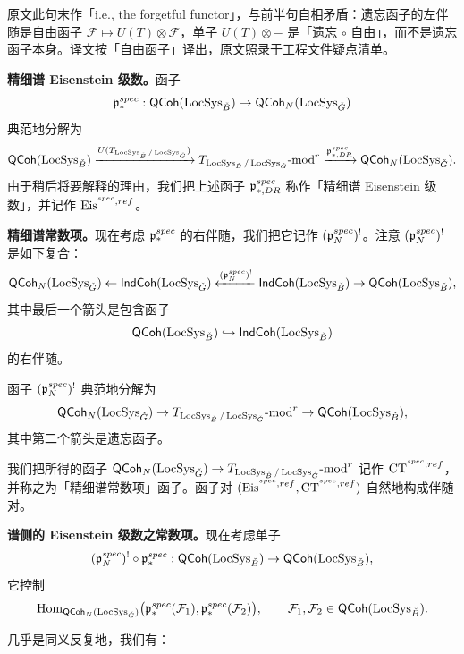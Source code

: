 \begin{annote}
原文此句末作「i.e., the forgetful functor」，与前半句自相矛盾：遗忘函子的左伴随是自由函子 $\mathcal F\mapsto U(T)\otimes\mathcal F$，单子 $U(T)\otimes-$ 是「遗忘 $\circ$ 自由」，而不是遗忘函子本身。译文按「自由函子」译出，原文照录于工程文件疑点清单。\par\vspace{0.15em}{\raggedleft 【来源：原书 p.6 §4.2（A）；译者按（单子与伴随函子的一般理论）】\par}
\end{annote}

\textbf{精细谱 Eisenstein 级数。}函子
\[
  \mathfrak{p}^{spec}_* : \mathsf{QCoh}(\operatorname{LocSys}_{\check B})\to\mathsf{QCoh}_N(\operatorname{LocSys}_{\check G})
\]
典范地分解为
\[
  \mathsf{QCoh}(\operatorname{LocSys}_{\check B})\xrightarrow{U(T_{\operatorname{LocSys}_{\check B}/\operatorname{LocSys}_{\check G}})}
  T_{\operatorname{LocSys}_{\check B}/\operatorname{LocSys}_{\check G}}\text{-}\mathrm{mod}^r
  \xrightarrow{\mathfrak{p}^{spec}_{*,DR}}
  \mathsf{QCoh}_N(\operatorname{LocSys}_{\check G}).
\]
由于稍后将要解释的理由，我们把上述函子 $\mathfrak{p}^{spec}_{*,DR}$ 称作「精细谱 Eisenstein 级数」，并记作 $\mathrm{Eis}^{^{spec},ref}$。

\textbf{精细谱常数项。}现在考虑 $\mathfrak{p}^{spec}_*$ 的右伴随，我们把它记作 $(\mathfrak{p}^{spec}_N)^!$。注意 $(\mathfrak{p}^{spec}_N)^!$ 是如下复合：
\[
  \mathsf{QCoh}_N(\operatorname{LocSys}_{\check G})\leftarrow \mathsf{IndCoh}(\operatorname{LocSys}_{\check G})
  \xleftarrow{(\mathfrak{p}^{spec}_N)^!}\mathsf{IndCoh}(\operatorname{LocSys}_{\check B})
  \to \mathsf{QCoh}(\operatorname{LocSys}_{\check B}),
\]
其中最后一个箭头是包含函子
\[
  \mathsf{QCoh}(\operatorname{LocSys}_{\check B})\hookrightarrow\mathsf{IndCoh}(\operatorname{LocSys}_{\check B})
\]
的右伴随。

函子 $(\mathfrak{p}^{spec}_N)^!$ 典范地分解为
\[
  \mathsf{QCoh}_N(\operatorname{LocSys}_{\check G})\to
  T_{\operatorname{LocSys}_{\check B}/\operatorname{LocSys}_{\check G}}\text{-}\mathrm{mod}^r\to
  \mathsf{QCoh}(\operatorname{LocSys}_{\check B}),
\]
其中第二个箭头是遗忘函子。

我们把所得的函子 $\mathsf{QCoh}_N(\operatorname{LocSys}_{\check G})\to T_{\operatorname{LocSys}_{\check B}/\operatorname{LocSys}_{\check G}}\text{-}\mathrm{mod}^r$ 记作 $\mathrm{CT}^{^{spec},ref}$，并称之为「精细谱常数项」函子。函子对 $(\mathrm{Eis}^{^{spec},ref},\mathrm{CT}^{^{spec},ref})$ 自然地构成伴随对。

\textbf{谱侧的 Eisenstein 级数之常数项。}现在考虑单子
\[
  (\mathfrak{p}^{spec}_N)^!\circ\mathfrak{p}^{spec}_* : \mathsf{QCoh}(\operatorname{LocSys}_{\check B})\to\mathsf{QCoh}(\operatorname{LocSys}_{\check B}),
\]
它控制
\[
  \operatorname{Hom}_{\mathsf{QCoh}_N(\operatorname{LocSys}_{\check G})}\bigl(\mathfrak{p}^{spec}_*(\mathcal F_1),\mathfrak{p}^{spec}_*(\mathcal F_2)\bigr),
  \qquad \mathcal F_1,\mathcal F_2\in\mathsf{QCoh}(\operatorname{LocSys}_{\check B}).
\]

几乎是同义反复地，我们有：

